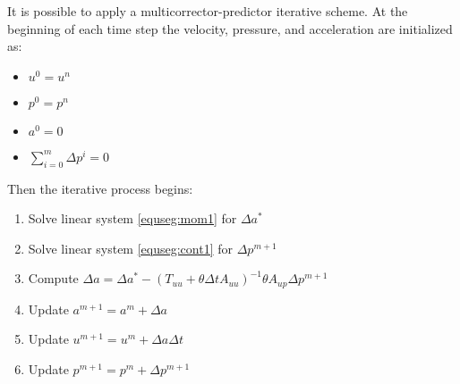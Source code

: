 \begin{frame}
  It is possible to apply a multicorrector-predictor iterative scheme. At the beginning of each time step the velocity, pressure, and acceleration are initialized as:
\begin{itemize}
\item $u^0 = u^n$
\item $p^0 = p^n$
\item $a^0 = 0$
\item $\sum_{i=0}^m \Delta p^i = 0$
\end{itemize}

Then the iterative process begins:

\begin{enumerate}
    \item Solve linear system \eqref{equseg:mom1} for $\Delta a^*$
    \item Solve linear system \eqref{equseg:cont1} for $\Delta p^{m+1}$
    \item Compute $\Delta a = \Delta a^* - (T_{uu}+\theta\Delta t A_{uu})^{-1}\theta A_{up}  \Delta p^{m+1}$
    \item Update $a^{m+1} = a^m + \Delta a$
    \item Update $u^{m+1} = u^m + \Delta a \Delta t$
    \item Update $p^{m+1} = p^m +\Delta p^{m+1}$
\end{enumerate}

\end{frame}